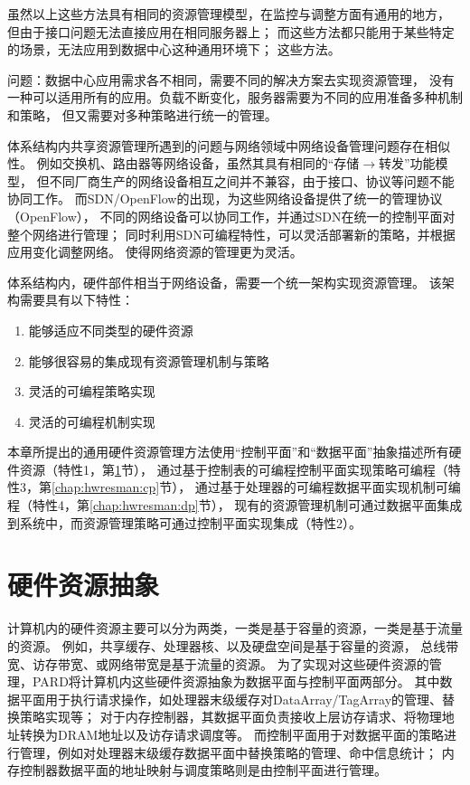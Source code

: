 虽然以上这些方法具有相同的资源管理模型，在监控与调整方面有通用的地方，
但由于接口问题无法直接应用在相同服务器上；
而这些方法都只能用于某些特定的场景，无法应用到数据中心这种通用环境下；
这些方法。

问题：数据中心应用需求各不相同，需要不同的解决方案去实现资源管理，
没有一种可以适用所有的应用。负载不断变化，服务器需要为不同的应用准备多种机制和策略，
但又需要对多种策略进行统一的管理。

体系结构内共享资源管理所遇到的问题与网络领域中网络设备管理问题存在相似性。
例如交换机、路由器等网络设备，虽然其具有相同的``存储$\rightarrow$转发''功能模型，
但不同厂商生产的网络设备相互之间并不兼容，由于接口、协议等问题不能协同工作。
而SDN/OpenFlow的出现，为这些网络设备提供了统一的管理协议（OpenFlow），
不同的网络设备可以协同工作，并通过SDN在统一的控制平面对整个网络进行管理；
同时利用SDN可编程特性，可以灵活部署新的策略，并根据应用变化调整网络。
使得网络资源的管理更为灵活。


体系结构内，硬件部件相当于网络设备，需要一个统一架构实现资源管理。
该架构需要具有以下特性：

\begin{enumerate}[1{）}]
  \item 能够适应不同类型的硬件资源
  \item 能够很容易的集成现有资源管理机制与策略
  \item 灵活的可编程策略实现
  \item 灵活的可编程机制实现
\end{enumerate}

本章所提出的通用硬件资源管理方法使用``控制平面''和``数据平面''抽象描述所有硬件资源（特性1，第\ref{chap:hwresman:res}节），
通过基于控制表的可编程控制平面实现策略可编程（特性3，第\ref{chap:hwresman:cp}节），
通过基于处理器的可编程数据平面实现机制可编程（特性4，第\ref{chap:hwresman:dp}节），
现有的资源管理机制可通过数据平面集成到系统中，而资源管理策略可通过控制平面实现集成（特性2）。



\section{硬件资源抽象}
\label{chap:hwresman:res}

计算机内的硬件资源主要可以分为两类，一类是基于容量的资源，一类是基于流量的资源。
例如，共享缓存、处理器核、以及硬盘空间是基于容量的资源，
总线带宽、访存带宽、或网络带宽是基于流量的资源。
为了实现对这些硬件资源的管理，PARD将计算机内这些硬件资源抽象为数据平面与控制平面两部分。
其中数据平面用于执行请求操作，如处理器末级缓存对DataArray/TagArray的管理、替换策略实现等；
对于内存控制器，其数据平面负责接收上层访存请求、将物理地址转换为DRAM地址以及访存请求调度等。
而控制平面用于对数据平面的策略进行管理，例如对处理器末级缓存数据平面中替换策略的管理、命中信息统计；
内存控制器数据平面的地址映射与调度策略则是由控制平面进行管理。

